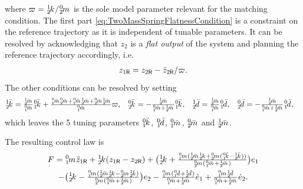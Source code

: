 where $\varpi = \sfrac{\bodyStiffness{1}{2}}{\bodyMass{0}{2}}$ is the sole model parameter relevant for the matching condition.
The first part \eqref{eq:TwoMassSpringFlatnessCondition} is a constraint on the reference trajectory as it is independent of tunable parameters.
It can be resolved by acknowledging that $z_2$ is a \textit{flat output} of the system and planning the reference trajectory accordingly, i.e.
\begin{align}
 z_{1\mathsf{R}} = z_{2\mathsf{R}} - \ddot{z}_{2\mathsf{R}} / \varpi. 
\end{align}
The other conditions can be resolved by setting
\begin{align}\label{eq:TwoMassSpringMatchingConditionSolution}
 \bodyStiffnessC{1}{2} &=  \tfrac{\bodyMassC{1}{2}}{\bodyMassC{0}{1}} \bodyStiffnessC{0}{1} + \tfrac{\bodyMassC{0}{1} \bodyMassC{0}{2} + \bodyMassC{0}{1} \bodyMassC{1}{2} + \bodyMassC{0}{2} \bodyMassC{1}{2}}{\bodyMassC{0}{1}} \varpi,&
 \bodyStiffnessC{0}{2} &= -\tfrac{\bodyMassC{1}{2}}{\bodyMassC{0}{1}+\bodyMassC{1}{2}} \bodyStiffnessC{0}{1},&
 \bodyDampingC{1}{2} &= \tfrac{\bodyMassC{1}{2}}{\bodyMassC{0}{1}} \bodyDampingC{0}{1},&
 \bodyDampingC{0}{2} &= -\tfrac{\bodyMassC{1}{2}}{\bodyMassC{0}{1}+\bodyMassC{1}{2}} \bodyDampingC{0}{1},
\end{align}
which leaves the 5 tuning parameters $\bodyStiffnessC{0}{1}$, $\bodyDampingC{0}{1}$, $\bodyMassC{0}{1}$, $\bodyMassC{0}{2}$ and $\bodyMassC{1}{2}$.

The resulting control law is
\begin{multline}
 F = \bodyMass{0}{1} \ddot{z}_{1\idxRef}  +  \bodyStiffness{1}{2} (z_{1\idxRef} - z_{2\idxRef})
 + \big( \bodyStiffness{1}{2} + \tfrac{\bodyMass{0}{1} (\bodyMassC{1}{2} \bodyStiffness{1}{2} + \bodyMass{0}{2} (\bodyStiffnessC{0}{1} - \bodyStiffnessC{1}{2}))}{\bodyMass{0}{2} (\bodyMassC{0}{1} + \bodyMassC{1}{2})} \big) e_1
\\
 - \big( \bodyStiffness{1}{2} - \tfrac{\bodyMass{0}{1} (\bodyMassC{1}{2} \bodyStiffness{1}{2} - \bodyMass{0}{2} \bodyStiffnessC{1}{2})}{\bodyMass{0}{2} (\bodyMassC{0}{1} + \bodyMassC{1}{2})} \big) e_2
 - \tfrac{\bodyMass{0}{1} (\bodyDampingC{0}{1} + \bodyDampingC{1}{2})}{\bodyMassC{0}{1} + \bodyMassC{1}{2}} \dot{e}_1
 + \tfrac{\bodyMass{0}{1} \bodyDampingC{1}{2}}{\bodyMassC{0}{1} + \bodyMassC{1}{2}} \dot{e}_2
 .
\end{multline}

